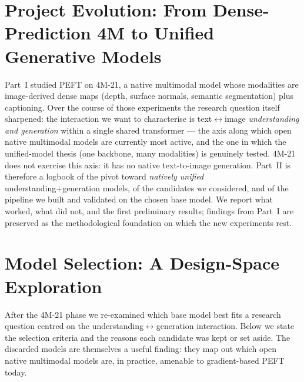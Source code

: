
\section{Project Evolution: From Dense-Prediction 4M to Unified Generative Models}

Part~I studied PEFT on 4M-21, a native multimodal model whose modalities are
image-derived dense maps (depth, surface normals, semantic segmentation) plus
captioning. Over the course of those experiments the research question itself
sharpened: the interaction we want to characterise is text$\leftrightarrow$image
\emph{understanding and generation} within a single shared transformer ---
the axis along which open native multimodal models are currently most active,
and the one in which the unified-model thesis (one backbone, many modalities)
is genuinely tested. 4M-21 does not exercise this axis: it has no native
text-to-image generation. Part~II is therefore a logbook of the pivot toward
\emph{natively unified} understanding+generation models, of the candidates we
considered, and of the pipeline we built and validated on the chosen base
model. We report what worked, what did not, and the first preliminary results;
findings from Part~I are preserved as the methodological foundation on which
the new experiments rest.

\section{Model Selection: A Design-Space Exploration}

After the 4M-21 phase we re-examined which base model best fits a research
question centred on the understanding$\leftrightarrow$generation interaction.
Below we state the selection criteria and the reasons each candidate was kept
or set aside. The discarded models are themselves a useful finding: they map
out which open native multimodal models are, in practice, amenable to
gradient-based PEFT today.

